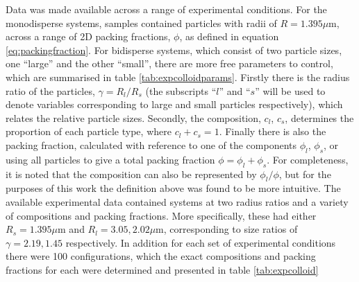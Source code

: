 Data was made available across a range of experimental conditions.
For the monodisperse systems, samples contained particles with radii of $R=1.395\mu$m, across a range of 2D packing fractions, $\phi$, as defined in equation \eqref{eq:packingfraction}.
For bidisperse systems, which consist of two particle sizes, one ``large'' and the other ``small'', there are more free parameters to control, which are summarised in table \ref{tab:expcolloidparams}.
Firstly there is the radius ratio of the particles, $\gamma=R_l/R_s$ (the subscripts ``$l$'' and ``$s$'' will be used to denote variables corresponding to large and small particles respectively), which relates the relative particle sizes.
Secondly, the composition, $c_l$, $c_s$, determines the proportion of each particle type, where $c_l+c_s=1$.
Finally there is also the packing fraction, calculated with reference to one of the components $\phi_l$, $\phi_s$, or using all particles to give a total packing fraction $\phi=\phi_l+\phi_s$.
For completeness, it is noted that the composition can also be represented by $\phi_l/\phi$, but for the purposes of this work the definition above was found to be more intuitive.
The available experimental data contained systems at two radius ratios and a variety of compositions and packing fractions.
More specifically, these had either $R_s=1.395\mu$m and $R_l=3.05,2.02\mu$m, corresponding to size ratios of $\gamma=2.19, 1.45$ respectively.
In addition for each set of experimental conditions there were 100 configurations, which the exact compositions and packing fractions for each were determined and presented in table \ref{tab:expcolloid}

